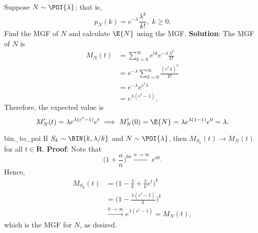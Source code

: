 \begin{Example}{}{}
    Suppose $ N\sim \POI{\lambda} $; that is,
    \[ p_N(k)=e^{-\lambda}\frac{\lambda^k}{k!},\; k\ge 0. \]
    Find the MGF of $ N $ and calculate $ \E{N} $ using the MGF\@.
    \tcblower{}
    \textbf{Solution}: The MGF of $ N $ is
    \begin{align*}
        M_N(t)
         & =\sum_{k=0}^{\infty}e^{tk}e^{-\lambda}\frac{\lambda^k}{k!} \\
         & =e^{-\lambda}\sum_{k=0}^{\infty}\frac{(e^t \lambda)^k}{k!} \\
         & =e^{-\lambda}e^{e^{t}\lambda}                              \\
         & =e^{\lambda(e^t-1)}.
    \end{align*}
    Therefore, the expected value is
    \[ M_N'(t)=\lambda e^{\lambda(e^t-1)}e^t
        \implies M_N'(0)=\E{N}=\lambda e^{\lambda(1-1)}e^0=\lambda. \]
\end{Example}
\begin{Proposition}{}{bin_to_poi}
    If $ S_k \sim\BIN{k,\lambda/k} $
    and $ N\sim\POI{\lambda} $, then
    $ M_{S_k}(t)\to M_N(t) $ for all $ t\in\mathbf{R} $.
    \tcblower{}
    \textbf{Proof}: Note that
    \[ \biggl(1+\frac{a}{n}\biggr)^{\!bn}\xrightarrow{n\to\infty} e^{ab}. \]
    Hence,
    \begin{align*}
        M_{S_k}(t)
         & =\biggl(1-\frac{\lambda}{k}+\frac{\lambda}{k}e^t\biggr)^{\!k} \\
         & =\biggl(1-\frac{\lambda(e^t-1)}{k}\biggr)^{\!k}               \\
         & \xrightarrow{k\to\infty}
        e^{\lambda(e^t-1)}=M_N(t),
    \end{align*}
    which is the MGF for $ N $, as desired.
\end{Proposition}

